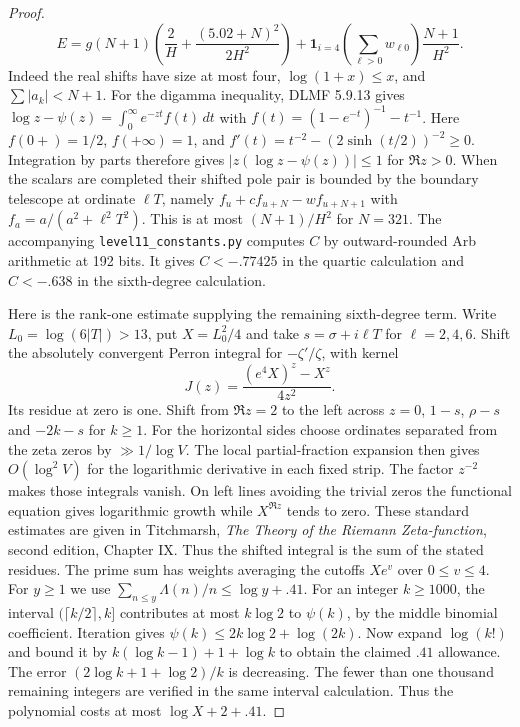 \documentclass[11pt]{article}
\begin{document}
\begin{proof}
\[
 E=g(N+1)\left(\frac2H+\frac{(5.02+N)^2}{2H^2}\right)
           + \mathbf1_{i=4}\left(\sum_{\ell>0}w_{\ell0}\right)\frac{N+1}{H^2}.
\]
Indeed the real shifts have size at most four, $\log(1+x)\le x$, and $\sum|a_k|<N+1$. For the digamma inequality, DLMF 5.9.13 gives $\log z-\psi(z)=\int_0^\infty e^{-zt} f(t)\,dt$ with $f(t)=(1-e^{-t})^{-1}-t^{-1}$. Here $f(0+)=1/2$, $f(+\infty)=1$, and $f'(t)=t^{-2}-(2\sinh(t/2))^{-2}\ge0$. Integration by parts therefore gives $|z(\log z-\psi(z))|\le1$ for $\Re z>0$. When the scalars are completed their shifted pole pair is bounded by the boundary telescope at ordinate $\ell T$, namely $f_u+c f_{u+N}-w f_{u+N+1}$ with $f_a=a/(a^2+\ell^2 T^2)$. This is at most $(N+1)/H^2$ for $N=321$. The accompanying \texttt{level11\_constants.py} computes $C$ by outward-rounded Arb arithmetic at 192 bits. It gives $C<-.77425$ in the quartic calculation and $C<-.638$ in the sixth-degree calculation.

Here is the rank-one estimate supplying the remaining sixth-degree term. Write $L_0=\log(6|T|)>13$, put $X=L_0^2/4$ and take $s=\sigma+i\ell T$ for $\ell=2,4,6$. Shift the absolutely convergent Perron integral for $-\zeta'/\zeta$, with kernel
\[
 J(z)=\frac{(e^4X)^z-X^z}{4z^2}.
\]
Its residue at zero is one. Shift from $\Re z=2$ to the left across $z=0$, $1-s$, $\rho-s$ and $-2k-s$ for $k\ge1$. For the horizontal sides choose ordinates separated from the zeta zeros by $\gg1/\log V$. The local partial-fraction expansion then gives $O(\log^2 V)$ for the logarithmic derivative in each fixed strip. The factor $z^{-2}$ makes those integrals vanish. On left lines avoiding the trivial zeros the functional equation gives logarithmic growth while $X^{\Re z}$ tends to zero. These standard estimates are given in Titchmarsh, \emph{The Theory of the Riemann Zeta-function}, second edition, Chapter IX. Thus the shifted integral is the sum of the stated residues. The prime sum has weights averaging the cutoffs $Xe^v$ over $0\le v\le4$. For $y\ge1$ we use $\sum_{n\le y}\Lambda(n)/n\le\log y+.41$. For an integer $k\ge1000$, the interval $(\lceil k/2\rceil,k]$ contributes at most $k\log 2$ to $\psi(k)$, by the middle binomial coefficient. Iteration gives $\psi(k)\le2k\log2+\log(2k)$. Now expand $\log(k!)$ and bound it by $k(\log k-1)+1+\log k$ to obtain the claimed $.41$ allowance. The error $(2\log k+1+\log2)/k$ is decreasing. The fewer than one thousand remaining integers are verified in the same interval calculation. Thus the polynomial costs at most $\log X+2+.41$.


\end{proof}
\end{document}
